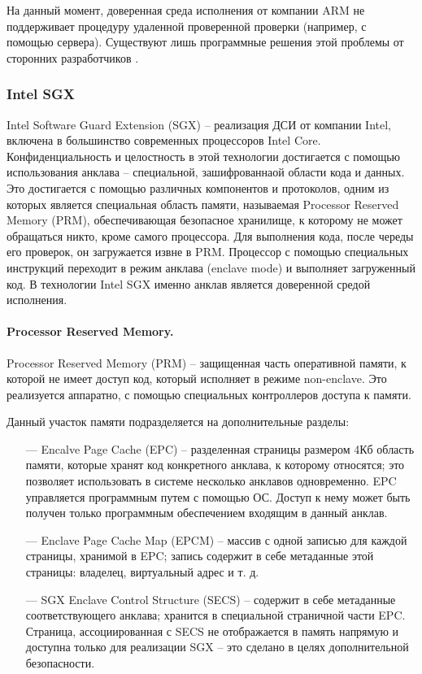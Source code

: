 На данный момент, доверенная среда исполнения от компании ARM не поддерживает процедуру удаленной проверенной проверки (например, с помощью сервера). Существуют лишь программные решения этой проблемы от сторонних разработчиков \cite{comparsion-arm-intel}.


\subsubsection{Intel SGX}

Intel Software Guard Extension (SGX) -- реализация ДСИ от компании Intel, включена в большинство современных процессоров Intel Core. Конфиденциальность и целостность в этой технологии достигается с помощью использования анклава -- специальной, зашифрованнаой области кода и данных. Это достигается с помощью различных компонентов и протоколов, одним из которых является специальная область памяти, называемая Processor Reserved Memory (PRM), обеспечивающая безопасное хранилище, к которому не может обращаться никто, кроме самого процессора. Для выполнения кода, после череды его проверок, он загружается извне в PRM. Процессор с помощью специальных инструкций переходит в режим анклава (enclave mode) и выполняет загруженный код. В технологии Intel SGX именно анклав является доверенной средой исполнения.

\paragraph{Processor Reserved Memory.}

Processor Reserved Memory (PRM) -- защищенная часть оперативной памяти, к которой не имеет доступ код, который исполняет в режиме non-enclave. Это реализуется аппаратно, с помощью специальных контроллеров доступа к памяти. 

Данный участок памяти подразделяется на дополнительные разделы:

\begin{itemize}
	\item [---] Encalve Page Cache (EPC) -- разделенная страницы размером 4Кб область памяти, которые хранят код конкретного анклава, к которому относятся; это позволяет использовать в системе несколько анклавов одновременно. EPC управляется программным путем с помощью ОС. Доступ к нему может быть получен только программным обеспечением входящим в данный анклав.
	\item [---] Enclave Page Cache Map (EPCM) -- массив с одной записью для каждой страницы, хранимой в EPC; запись содержит в себе метаданные этой страницы: владелец, виртуальный адрес и т. д.
	\item [---] SGX Enclave Control Structure (SECS) -- содержит в себе метаданные соответствующего анклава; хранится в специальной страничной части EPC. Страница, ассоциированная с SECS не отображается в память напрямую и доступна только для реализации SGX -- это сделано в целях дополнительной безопасности.
\end{itemize}

